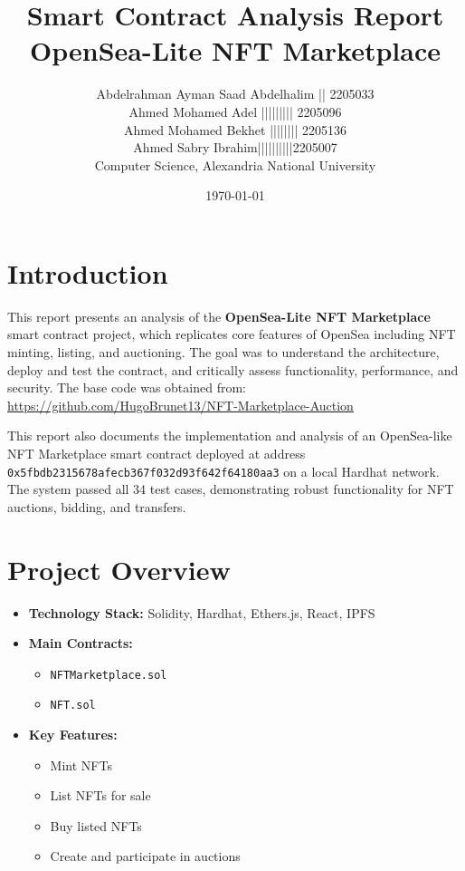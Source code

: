 \documentclass{article}
\title{Smart Contract Analysis Report \\ \large OpenSea-Lite NFT Marketplace}
\author{Abdelrahman Ayman Saad Abdelhalim || 2205033
\\ Ahmed Mohamed Adel ||||||||| 2205096
\\ Ahmed Mohamed Bekhet |||||||| 2205136
\\ Ahmed Sabry Ibrahim||||||||||2205007
\\ Computer Science, Alexandria National University}
\date{\today}
\begin{document}
\maketitle

\section*{Introduction}
This report presents an analysis of the \textbf{OpenSea-Lite NFT Marketplace} smart contract project, which replicates core features of OpenSea including NFT minting, listing, and auctioning. The goal was to understand the architecture, deploy and test the contract, and critically assess functionality, performance, and security. The base code was obtained from: \\
\url{https://github.com/HugoBrunet13/NFT-Marketplace-Auction}

This report also documents the implementation and analysis of an OpenSea-like NFT Marketplace smart contract deployed at address \texttt{0x5fbdb2315678afecb367f032d93f642f64180aa3} on a local Hardhat network. The system passed all 34 test cases, demonstrating robust functionality for NFT auctions, bidding, and transfers.

\section*{Project Overview}
\begin{itemize}
  \item \textbf{Technology Stack:} Solidity, Hardhat, Ethers.js, React, IPFS
  \item \textbf{Main Contracts:}
    \begin{itemize}
      \item \texttt{NFTMarketplace.sol}
      \item \texttt{NFT.sol}
    \end{itemize}
  \item \textbf{Key Features:}
    \begin{itemize}
      \item Mint NFTs
      \item List NFTs for sale
      \item Buy listed NFTs
      \item Create and participate in auctions
    \end{itemize}
\end{itemize}
\end{document}
